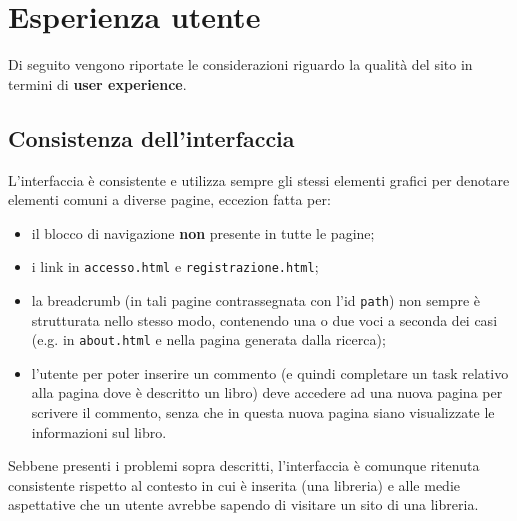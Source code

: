 




\section{Esperienza utente}\label{sec:user-exp}
Di seguito vengono riportate le considerazioni riguardo la qualità del sito in
termini di \textbf{user experience}.

\subsection{Consistenza dell'interfaccia}\label{sec:user-ui_consistency}
L'interfaccia è consistente e utilizza sempre gli stessi elementi grafici per
denotare elementi comuni a diverse pagine, eccezion fatta per:
\begin{itemize}
\item il blocco di navigazione \textbf{non} presente in tutte le pagine;
\item i link in \texttt{accesso.html} e \texttt{registrazione.html};
\item la breadcrumb (in tali pagine contrassegnata con l'id \texttt{path}) non
sempre è strutturata nello stesso modo, contenendo una o due voci a seconda
dei casi (e.g. in \texttt{about.html} e nella pagina generata dalla ricerca);
\item l'utente per poter inserire un commento (e quindi completare un task
relativo alla pagina dove è descritto un libro) deve accedere ad una nuova
pagina per scrivere il commento, senza che in questa nuova pagina siano
visualizzate le informazioni sul libro.
\end{itemize}

Sebbene presenti i problemi sopra descritti, l'interfaccia è comunque ritenuta
consistente rispetto al contesto in cui è inserita (una libreria) e alle
medie aspettative che un utente avrebbe sapendo di visitare un sito di una
libreria.


